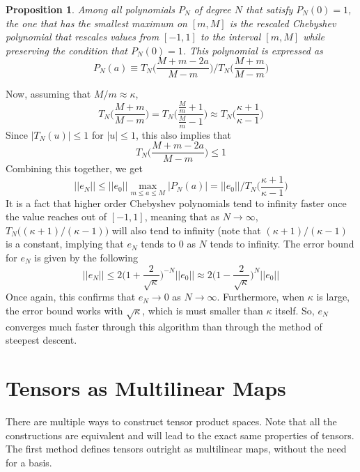 \documentclass{article}
\newtheorem{proposition}[theorem]{Proposition}
\theoremstyle{remark}
\theoremstyle{definition}
\begin{document}
\begin{proposition}
Among all polynomials $P_N$ of degree $N$ that satisfy $P_N (0) = 1$, the one that has the smallest maximum on $[m, M]$ is the \textit{rescaled Chebyshev polynomial} that rescales values from $[-1, 1]$ to the interval $[m, M]$ while preserving the condition that $P_N (0) = 1$. This polynomial is expressed as
\[P_N (a) \equiv T_N \bigg( \frac{M+m-2a}{M-m} \bigg) \bigg/ T_N \bigg(\frac{M+m}{M-m} \bigg)\]
\end{proposition} 
Now, assuming that $M/m \approx \kappa$, 
\[T_N \bigg( \frac{M+m}{M-m} \bigg) = T_N \bigg(\frac{\frac{M}{m} + 1}{\frac{M}{m}-1} \bigg) \approx T_N \bigg(\frac{\kappa + 1}{\kappa - 1} \bigg)\]
Since $|T_N (u)| \leq 1$ for $|u| \leq 1$, this also implies that
\[T_N \bigg( \frac{M + m - 2a}{M-m} \bigg) \leq 1\]
Combining this together, we get
\[||e_N|| \leq ||e_0|| \max_{m \leq a \leq M} |P_N (a)| = ||e_0|| \bigg/ T_N \bigg( \frac{\kappa+1}{\kappa-1} \bigg)\]
It is a fact that higher order Chebyshev polynomials tend to infinity faster once the value reaches out of $[-1, 1]$, meaning that as $N \rightarrow \infty$, $T_N\big( (\kappa+1)/(\kappa-1)\big)$ will also tend to infinity (note that $(\kappa+1)/(\kappa-1)$ is a constant, implying that $e_N$ tends to $0$ as $N$ tends to infinity. The error bound for $e_N$ is given by the following 
\[||e_N|| \leq 2 \bigg( 1 + \frac{2}{\sqrt{\kappa}} \bigg)^{-N} ||e_0|| \approx 2 \bigg( 1 - \frac{2}{\sqrt{\kappa}} \bigg)^{N} ||e_0||\]
Once again, this confirms that $e_N \rightarrow 0$ as $N \rightarrow \infty$. Furthermore, when $\kappa$ is large, the error bound works with $\sqrt{\kappa}$, which is must smaller than $\kappa$ itself. So, $e_N$ converges much faster through this algorithm than through the method of steepest descent. 

\section{Tensors as Multilinear Maps}
There are multiple ways to construct tensor product spaces. Note that all the constructions are equivalent and will lead to the exact same properties of tensors. The first method defines tensors outright as multilinear maps, without the need for a basis. 
\end{document}
